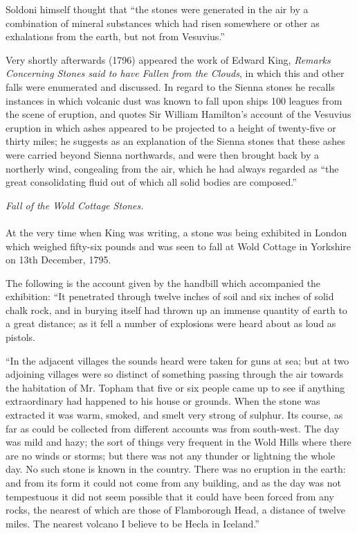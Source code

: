 \documentclass[a4paper, 12pt, oneside]{article}
\begin{document}
Soldoni himself thought that ``the stones were generated in the air by a combination of mineral substances which had risen somewhere or other as exhalations from the earth, but not from Vesuvius.''

Very shortly afterwards (1796) appeared the work of Edward King, \emph{Remarks Concerning Stones said to have Fallen from the Clouds}, in which this and other falls were enumerated and discussed. In regard to the Sienna stones he recalls instances in which volcanic dust was known to fall upon ships 100 leagues from the scene of eruption, and quotes Sir William Hamilton's account of the Vesuvius eruption in which ashes appeared to be projected to a height of twenty-five or thirty miles; he suggests as an explanation of the Sienna stones that these ashes were carried beyond Sienna northwards, and were then brought back by a northerly wind, congealing from the air, which he had always regarded as ``the great consolidating fluid out of which all solid bodies are composed.'' 
\begin{center}
\emph{Fall of the Wold Cottage Stones.}
\end{center}
\paragraph{}
At the very time when King was writing, a stone was being exhibited in London which weighed fifty-six pounds and was seen to fall at Wold Cottage in Yorkshire on 13th December, 1795. 

The following is the account given by the handbill which accompanied the exhibition: ``It penetrated through twelve inches of soil and six inches of solid chalk rock, and in burying itself had thrown up an immense quantity of earth to a great distance; as it fell a number of explosions were heard about as loud as pistols. 

``In the adjacent villages the sounds heard were taken for guns at sea; but at two adjoining villages were so distinct of something passing through the air towards the habitation of Mr. Topham that five or six people came up to see if anything extraordinary had happened to his house or grounds. When the stone was extracted it was warm, smoked, and smelt very strong of sulphur. Its course, as far as could be collected from different accounts was from south-west. The day was mild and hazy; the sort of things very frequent in the Wold Hills where there are no winds or storms; but there was not any thunder or lightning the whole day. No such stone is known in the country. There was no eruption in the earth: and from its form it could not come from any building, and as the day was not tempestuous it did not seem possible that it could have been forced from any rocks, the nearest of which are those of Flamborough Head, a distance of twelve miles. The nearest volcano I believe to be Hecla in Iceland.'' 
\end{document}
